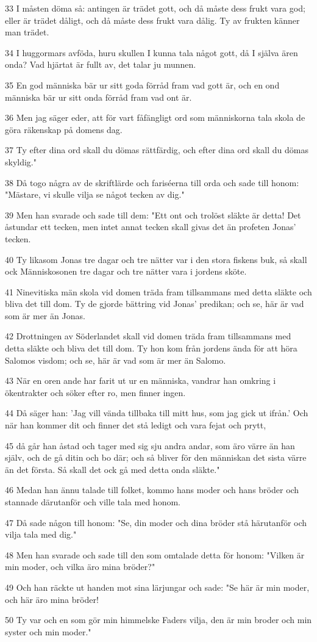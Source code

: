 \par 33 I måsten döma så: antingen är trädet gott, och då måste dess frukt vara god; eller är trädet dåligt, och då måste dess frukt vara dålig. Ty av frukten känner man trädet.
\par 34 I huggormars avföda, huru skullen I kunna tala något gott, då I själva ären onda? Vad hjärtat är fullt av, det talar ju munnen.
\par 35 En god människa bär ur sitt goda förråd fram vad gott är, och en ond människa bär ur sitt onda förråd fram vad ont är.
\par 36 Men jag säger eder, att för vart fåfängligt ord som människorna tala skola de göra räkenskap på domens dag.
\par 37 Ty efter dina ord skall du dömas rättfärdig, och efter dina ord skall du dömas skyldig."
\par 38 Då togo några av de skriftlärde och fariséerna till orda och sade till honom: "Mästare, vi skulle vilja se något tecken av dig."
\par 39 Men han svarade och sade till dem: "Ett ont och trolöst släkte är detta! Det åstundar ett tecken, men intet annat tecken skall givas det än profeten Jonas' tecken.
\par 40 Ty likasom Jonas tre dagar och tre nätter var i den stora fiskens buk, så skall ock Människosonen tre dagar och tre nätter vara i jordens sköte.
\par 41 Ninevitiska män skola vid domen träda fram tillsammans med detta släkte och bliva det till dom. Ty de gjorde bättring vid Jonas' predikan; och se, här är vad som är mer än Jonas.
\par 42 Drottningen av Söderlandet skall vid domen träda fram tillsammans med detta släkte och bliva det till dom. Ty hon kom från jordens ända för att höra Salomos visdom; och se, här är vad som är mer än Salomo.
\par 43 När en oren ande har farit ut ur en människa, vandrar han omkring i ökentrakter och söker efter ro, men finner ingen.
\par 44 Då säger han: 'Jag vill vända tillbaka till mitt hus, som jag gick ut ifrån.' Och när han kommer dit och finner det stå ledigt och vara fejat och prytt,
\par 45 då går han åstad och tager med sig sju andra andar, som äro värre än han själv, och de gå ditin och bo där; och så bliver för den människan det sista värre än det första. Så skall det ock gå med detta onda släkte."
\par 46 Medan han ännu talade till folket, kommo hans moder och hans bröder och stannade därutanför och ville tala med honom.
\par 47 Då sade någon till honom: "Se, din moder och dina bröder stå härutanför och vilja tala med dig."
\par 48 Men han svarade och sade till den som omtalade detta för honom: "Vilken är min moder, och vilka äro mina bröder?"
\par 49 Och han räckte ut handen mot sina lärjungar och sade: "Se här är min moder, och här äro mina bröder!
\par 50 Ty var och en som gör min himmelske Faders vilja, den är min broder och min syster och min moder."

